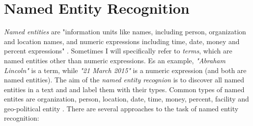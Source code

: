\documentclass[a4paper, 12pt, twoside]{fithesis2}		%
\renewcommand{\_}{\leavevmode \kern0.07em\vbox{\hrule width0.4em}}
\begin{document}




\section{Named Entity Recognition}
\label{sec:terms-extraction}
\textit{Named entities}
are "information units like names, including person, organization and location names, and numeric expressions including time, date, money and percent expressions" \autocite{named-entity-recognition}.
Sometimes I will specifically refer to \textit{terms}, which are named entities other than numeric expressions.
Es an example, \textit{"Abraham Lincoln"} is a term, while \textit{"21 March 2015"} is a numeric expression
(and both are named entities).
The aim of the \textit{named entity recognion} is to discover all named entities in a text and and label them with their types. Common types of named entites are organization, person, location, date, time, money, percent, facility and geo-political entity \cite[][281]{nlp-python}. There are several approaches to the task of named entity recognition:
\end{document}
